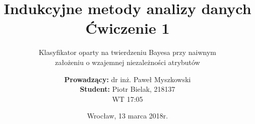 \documentclass{scrartcl}
\title{Indukcyjne metody analizy danych\\Ćwiczenie 1}
\subtitle{Klasyfikator oparty na twierdzeniu Bayesa przy naiwnym\\założeniu o wzajemnej niezależności atrybutów}
\author{\textbf{Prowadzący:} dr inż. Paweł Myszkowski \\ \textbf{Student:} Piotr Bielak, 218137\\WT 17:05}
\date{Wrocław, 13 marca 2018r.}
\begin{document}
\nocite{*}
\maketitle

\pagebreak
\tableofcontents

\pagebreak





\end{document}
